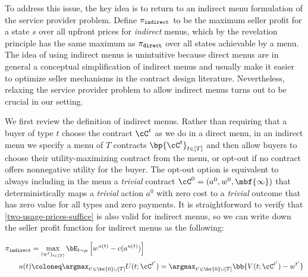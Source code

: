 To address this issue, the key idea is to return to an indirect menu formulation of the service provider problem. Define $\pi_{\tt{indirect}}$ to be the maximum seller profit for a state $s$ over all upfront prices for \emph{indirect} menus, which by the revelation principle has the same maximum as $\pi_{\tt{direct}}$ over all states achievable by a menu. The idea of using indirect menus is unintuitive because direct menus are in general a conceptual simplification of indirect menus and usually make it easier to optimize seller mechanisms in the contract design literature. Nevertheless, relaxing the service provider problem to allow indirect menus turns out to be crucial in our setting.

We first review the definition of indirect menus. Rather than requiring that a buyer of type $t$ choose the contract $\cC^t$ as we do in a direct menu, in an indirect menu we specify a menu of $T$ contracts $\bp{\cC^t}_{t\in [T]}$ and then allow buyers to choose their utility-maximizing contract from the menu, or opt-out if no contract offers nonnegative utility for the buyer. The opt-out option is equivalent to always including in the menu a \emph{trivial} contract $\cC^0 = (a^0, w^0, \mbf{\infty})$ that deterministically maps a \emph{trivial} action $a^0$ with zero cost to a \emph{trivial} outcome that has zero value for all types and zero payments. It is straightforward to verify that \cref{two-usage-prices-suffice} is also valid for indirect menus, so we can write down the seller profit function for indirect menus as the following:

\begin{tcolorbox}[title=Maximizing profit in indirect menus fixing actions and values]
    \begin{align*}
             \pi_{\tt{indirect}} &= \max_{(w^t)_{t\in [T]}}\bE_{t \sim \mu} \left[ w^{u(t)} - c(a^{u(t)}) \right] \\
            u(t) &\coloneq \argmax_{t'\in \bc{0} \cup [T]} U(t;\cC^{t'}) =  \argmax_{t'\in \bc{0} \cup [T]} \bb{V(t;\cC^{t'}) - w^{t'}}
          \end{align*}   
\end{tcolorbox}



